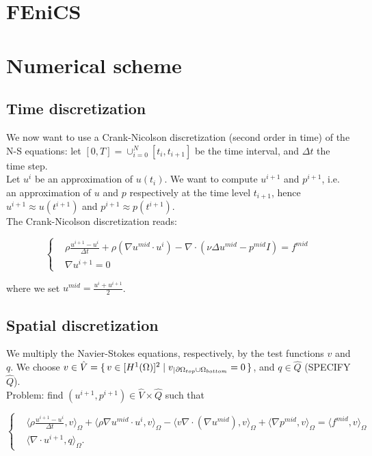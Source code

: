 \documentclass[11pt,a4paper,titlepage]{report}
\begin{document}

\section{FEniCS}

\section{Numerical scheme}

\subsection{Time discretization}
We now want to use a Crank-Nicolson discretization (second order in time) of the N-S equations: let $[0, T] = \cup^N_{i=0} [t_i, t_{i+1}] $ be the time interval, and $\Delta t$ the time step. \\
Let $u^i$ be an approximation of $u(t_i)$. We want to compute $u^{i+1}$ and $p^{i+1}$, i.e. an approximation of $u$ and $p$ respectively at the time level $t_{i+1}$, hence $u^{i+1} \approx u(t^{i+1})$ and $p^{i+1} \approx p(t^{i+1})$. \\
The Crank-Nicolson discretization reads:

\[
\left\{
\begin{aligned}
& \rho \frac{u^{i+1} - u^i}{\Delta t} + \rho (\nabla u^{mid} \cdot u^i) - \nabla \cdot (\nu \Delta u^{mid} - p^{mid}I) = f^{mid} \\
& \nabla u^{i+1} = 0
\end{aligned}
\right.
\]

where we set $u^{mid} = \frac{u^i + u^{i+1}}{2}$.

\subsection{Spatial discretization}
We multiply the Navier-Stokes equations, respectively, by the test functions $v$ and $q$. We choose $v \in \hat{V} = \set{v \in [H^1(\Omega)]^2 | v_|{_{\partial \Omega_{top} \cup \Omega_{bottom}}} = 0}$, and $q \in \hat{Q}$ (SPECIFY $\hat{Q}$). \\
Problem: find $(u^{i+1}, p^{i+1}) \in \hat{V} \times \hat{Q}$ such that

\[
\left\{
\begin{aligned}
& \langle \rho \frac{u^{i+1} - u^i}{\Delta t},v \rangle_\Omega
+ \langle \rho \nabla u^{mid} \cdot u^i  ,v \rangle_\Omega
- \langle v \nabla \cdot (\nabla u^{mid}) ,v \rangle_\Omega
+ \langle \nabla p^{mid} ,v \rangle_\Omega = \langle f^{mid} ,v \rangle_\Omega \\
& \langle \nabla \cdot u^{i+1},q \rangle_\Omega.
\end{aligned}
\right.
\]
\end{document}
